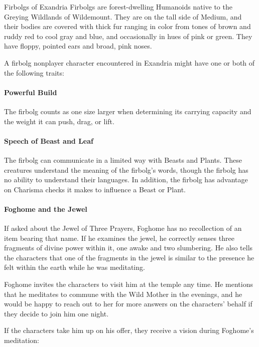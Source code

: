\documentclass[10pt,a4paper,twoside,twocolumn,openany,nodeprecatedcode]{dndbook}
\begin{document}
\begin{DndSidebar}{Firbolgs of Exandria}
Firbolgs are forest-dwelling Humanoids native to the Greying Wildlands of Wildemount. They are on the tall side of Medium, and their bodies are covered with thick fur ranging in color from tones of brown and ruddy red to cool gray and blue, and occasionally in hues of pink or green. They have floppy, pointed ears and broad, pink noses.

A firbolg nonplayer character encountered in Exandria might have one or both of the following traits:

\paragraph{Powerful Build}
The firbolg counts as one size larger when determining its carrying capacity and the weight it can push, drag, or lift.

\paragraph{Speech of Beast and Leaf}
The firbolg can communicate in a limited way with Beasts and Plants. These creatures understand the meaning of the firbolg's words, though the firbolg has no ability to understand their languages. In addition, the firbolg has advantage on Charisma checks it makes to influence a Beast or Plant.
\end{DndSidebar}

\paragraph{Foghome and the Jewel}
If asked about the Jewel of Three Prayers, Foghome has no recollection of an item bearing that name. If he examines the jewel, he correctly senses three fragments of divine power within it, one awake and two slumbering. He also tells the characters that one of the fragments in the jewel is similar to the presence he felt within the earth while he was meditating.

Foghome invites the characters to visit him at the temple any time. He mentions that he meditates to commune with the Wild Mother in the evenings, and he would be happy to reach out to her for more answers on the characters' behalf if they decide to join him one night.

If the characters take him up on his offer, they receive a vision during Foghome's meditation:
\end{document}
